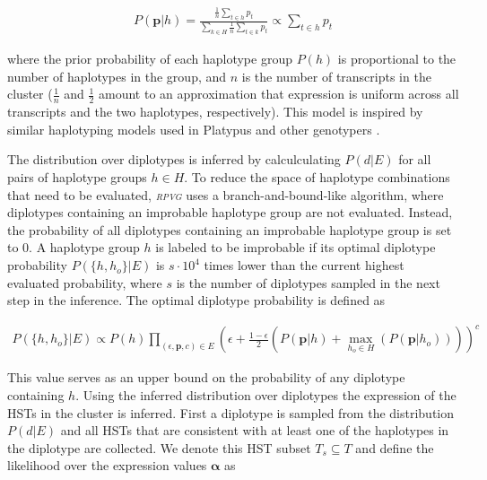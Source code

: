 \documentclass[11pt]{ucthesis}
\newcommand{\tool}[1]{\emph{\textsc{#1}}}
\begin{document}
\begin{align}
    P(\textbf{p}|h)=\frac{\frac{1}{n}\sum_{t\in h}p_t}{\sum_{k\in H}\frac{1}{n}\sum_{t\in k}p_t}\propto\sum_{t\in h}p_t
\end{align}

\noindent where the prior probability of each haplotype group $P(h)$ is proportional to the number of haplotypes in the group, and $n$ is the number of transcripts in the cluster ($\tfrac{1}{n}$ and $\tfrac{1}{2}$ amount to an approximation that expression is uniform across all transcripts and the two haplotypes, respectively). This model is inspired by similar haplotyping models used in Platypus and other genotypers \cite{rimmer2014integrating,albers2011dindel,poplin2017scaling}. 


The distribution over diplotypes is inferred by calculculating ${P(d|E)}$ for all pairs of haplotype groups ${h\in H}$. To reduce the space of haplotype combinations that need to be evaluated, \tool{rpvg} uses a branch-and-bound-like algorithm, where diplotypes containing an improbable haplotype group are not evaluated. Instead, the probability of all diplotypes containing an improbable haplotype group is set to 0. A haplotype group $h$ is labeled to be improbable if its optimal diplotype probability ${P(\{h,h_o\}|E)}$ is ${s\cdot 10^4}$ times lower than the current highest evaluated probability, where $s$ is the number of diplotypes sampled in the next step in the inference. The optimal diplotype probability is defined as

\begin{align}
    P(\{h,h_o\}|E)\propto P(h)\prod_{\left(\epsilon, \textbf{p}, c\right) \in E}\left(\epsilon+\frac{1-\epsilon}{2}\left(P(\textbf{p}|h)+\max_{h_o \in H}\left(P(\textbf{p}|h_o)\right)\right)\right)^c
\end{align}

\noindent This value serves as an upper bound on the probability of any diplotype containing $h$. 
\newline 
\newline
Using the inferred distribution over diplotypes the expression of the HSTs in the cluster is inferred. First a diplotype is sampled from the distribution $P(d|E)$ and all HSTs that are consistent with at least one of the haplotypes in the diplotype are collected. We denote this HST subset ${T_s\subseteq T}$ and define the likelihood over the expression values $\boldsymbol{\alpha}$ as 
\end{document}
